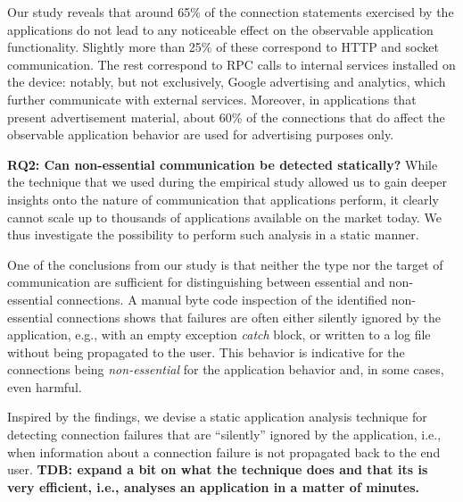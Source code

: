 Our study reveals that around 65\% of the connection statements exercised by the applications do not lead to any noticeable effect on the observable application functionality.
Slightly more than 25\% of these correspond to HTTP and socket communication. The rest correspond to RPC calls to internal services installed on the device: notably, but not exclusively, Google advertising and analytics, which further communicate with external services. 
Moreover, in applications that present advertisement material, about 60\% of the connections that do affect the observable application behavior are used for advertising purposes only.

\vspace{0.1in}
\noindent 
{\bf RQ2: Can non-essential communication be detected statically?}
While the technique that we used during the empirical study allowed us to gain deeper insights onto the nature of communication that applications perform, it clearly cannot scale up to thousands of applications available on the market today.
We thus investigate the possibility to perform such analysis in a static manner. 
 
One of the conclusions from our study is that neither the type nor the target of communication are sufficient for distinguishing between essential and non-essential connections.
A manual byte code inspection of the identified non-essential connections shows that failures are often either silently ignored by the application, e.g., with an empty exception \emph{catch} block, or written to a log file without being propagated to the user. 
This behavior is indicative for the connections being \emph{non-essential} for the application behavior and, in some cases, even harmful. 

Inspired by the findings, we devise a static application analysis technique for detecting connection failures that are
``silently''  ignored by the application, i.e., when information about a connection failure is not propagated back to the end user.
{\bf TDB: expand a bit on what the technique does and that its is very efficient, i.e., analyses an application in a matter of minutes.}

